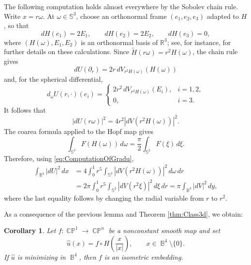 \documentclass[11pt]{article}
\theoremstyle{plain}
\numberwithin{equation}{section}
\newtheorem{corollary}[theorem]{Corollary}
\theoremstyle{definition}
\let\oldendproof\endproof
\renewenvironment{proof}[1][\proofname]{%
\oldproof[\upshape \bfseries #1]%
}{\oldendproof}
\def \R {\mathbb{R}}
\def \mb{\mathbb}
\DeclareMathOperator{\CP}{\mathbb{CP}}
\DeclareMathOperator{\B}{\mathbb{B}}
\begin{document}
\begin{proof}
    The following computation holds almost everywhere by the Sobolev chain
    rule.  Write $x=r\omega$.  At $\omega\in\mb S^3$, choose an orthonormal
    frame $(e_1,e_2,e_3)$ adapted to $H$, so that
    \[
        dH(e_1)=2E_1,\qquad dH(e_2)=2E_2,\qquad dH(e_3)=0,
    \]
    where $(H(\omega),E_1,E_2)$ is an orthonormal basis of $\R^3$; see, for instance, \cite[\S 2.3]{GuerraLamyZemas2025} for further details on these calculations.
    Since $\widetilde H(r\omega)=r^2H(\omega)$, the chain rule gives
    \[
        dU(\partial_r)
        =2r\,dV_{r^2H(\omega)}(H(\omega))
    \]
    and, for the spherical differential,
    \[
        d_\omega U(r,\cdot)(e_i)
        =\begin{cases}
        2r^2\,dV_{r^2H(\omega)}(E_i),&i=1,2,\\
        0,&i=3.
        \end{cases}
    \]
    It follows that
    \begin{equation}
        \label{eq:ComputationOfGradu}
        |dU(r\omega)|^2
        =4r^2|dV(r^2H(\omega))|^2.
    \end{equation}
    The coarea formula applied to the Hopf map gives
    \begin{equation}
        \label{eq:CoareaHopf}
        \int_{\mb S^3}F(H(\omega))\,d\omega
        =\frac{\pi}{2}\int_{\mb S^2}F(\xi)\,d\xi.
    \end{equation}
    Therefore, using \eqref{eq:ComputationOfGradu},
    \begin{align*}
        \int_{\B^4}|dU|^2\,dx
        &=4\int_0^1r^5\int_{\mb S^3}
          |dV(r^2H(\omega))|^2\,d\omega\,dr\\
        &=2\pi\int_0^1r^5\int_{\mb S^2}
          |dV(r^2\xi)|^2\,d\xi\,dr=\pi\int_{\B^3}|dV|^2\,dy,
    \end{align*}
    where the last equality follows by changing the radial variable from
    $r$ to $r^2$.
\end{proof}

As a consequence of the previous lemma and Theorem \ref{thm:Class3d}, we obtain:

\begin{corollary}\label{cor:minfactor}
    Let $f\colon\CP^1\to\CP^n$ be a nonconstant smooth map and set
    \[
        \hat u(x)=f\circ H\left(\frac{x}{|x|}\right),
        \qquad x\in\B^4\setminus\{0\}.
    \]
    If $\hat u$ is minimizing in $\B^4$, then $f$ is an
    isometric embedding.
\end{corollary}
\end{document}

